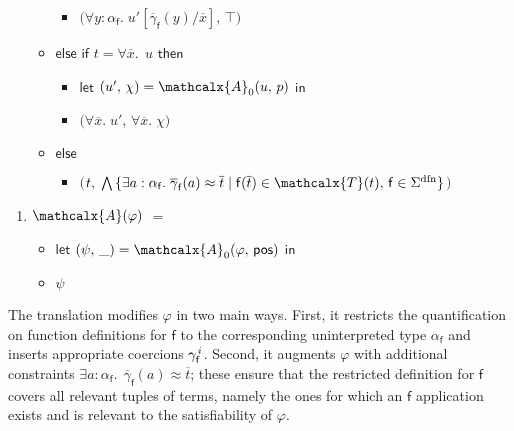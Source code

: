 \documentclass[runningheads,a4paper]{llncs}
\newcommand\return{}
\newcommand\bigtuple[1]{$\bigl(${#1}$\bigr)$}
\newcommand{\con}[1]{\mathsf{#1}}
\renewcommand\vec[1]{\overline{#1}}
\let\oldSigma=\Sigma
\def\Sigma{\mathrm{\oldSigma}}
\newcommand{\teq}{\approx}
\newcommand{\terms}{\mathcalx{T}}
\newcommand{\conv}{\mathcalx{A}}
\newcommand{\sfundefs}[1]{#1^\mathrm{dfn}}
\newcommand{\ppos}{\con{pos}}
\newcommand{\ltrue}{\top}
\newcommand\concret{\gamma} %
\newcommand{\vecfarg}[1]{\vec{\concret}_{#1}}
\newcommand{\fargx}[2]{\concret^{\vthinspace#2}_{#1}}
\newcommand{\fargsort}[1]{\alpha_{#1}}
\newcommand{\rem}[1]{\textcolor{red}{[#1]}}
\newcommand{\jb}[1]{\rem{#1 --jb}}
\newcommand{\vthinspace}{\kern+0.083333em}
\begin{document}
\begin{enumerate}
\begin{itemize}
\begin{itemize}
      \item[] \return \bigtuple{$\forall y : \fargsort{\con{f}}.\; u' [ \vecfarg{\con{f}}( y ) / \vec x ],\, \ltrue$}
    \end{itemize}
  \item[] $\mathsf{else}$ $\mathsf{if}$ $t = \forall \vec x.\;\, u$ $\mathsf{then}$
    \begin{itemize}
      \item[] $\mathsf{let}$ $( u',\, \chi ) = \conv_0( u,\, p )$ $\mathsf{in}$
      \item[] \return \bigtuple{$\forall \vec x.\; u',\, \forall \vec x.\; \chi$}
    \end{itemize}
   \item[] $\mathsf{else}$
   \begin{itemize}
     \item[] \return \bigtuple{$t,\; \bigwedge\, \{ \exists a : \fargsort{\con{f}}.\; \vecfarg{\con{f}}( a ) \teq \vec t \mid \con{f}( \vec t ) \in \terms( t ),\, \con{f} \in \sfundefs{\Sigma} \}$}
   \end{itemize}
 \end{itemize}
\end{enumerate}
\begin{enumerate}
\item[\ ]
$\conv( \varphi )$ $=$
 \begin{itemize}
   \item[] $\mathsf{let}$ $( \psi,\, \_ ) = \conv_0( \varphi,\, \ppos )$ $\mathsf{in}$
   \item[] \return $\psi$
  \end{itemize}
\end{enumerate}


The translation modifies $\varphi$ in two main ways. First, it restricts the
quantification on function definitions for $\con{f}$ to the corresponding
uninterpreted type $\fargsort{\con{f}}$ and inserts appropriate coercions
$\fargx{\con{f}}{i}$. Second, it augments $\varphi$ with additional constraints
$\exists a : \fargsort{\con{f}}.\;\, \vecfarg{\con{f}}( a ) \teq \vec t$; these
ensure that the restricted definition for $\con{f}$ covers all relevant tuples
of terms, namely the ones for which an $\con{f}$ application exists and is
relevant to the satisfiability of $\varphi$.
\end{document}
